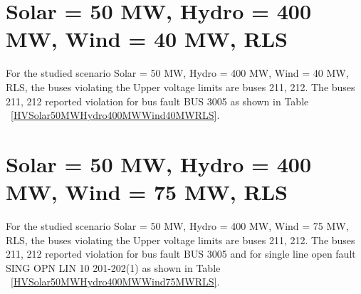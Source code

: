 \documentclass[10pt]{report}
\begin{document}
\section{Solar = 50 MW, Hydro = 400 MW, Wind = 40 MW, RLS}
For the studied scenario Solar = 50 MW, Hydro = 400 MW, Wind = 40 MW, RLS, the buses violating the Upper voltage limits are buses 211, 212.
The buses 211, 212 reported violation for bus fault BUS 3005 as shown in Table ~\ref{HVSolar50MWHydro400MWWind40MWRLS}.
\begin{table}[H]
\caption{Contingencies reporting bus voltages greater than emergency voltage of 1.1 PU for scenario Solar = 50 MW, Hydro = 400 MW, Wind = 40 MW, RLS}
\label{HVSolar50MWHydro400MWWind40MWRLS}
\centering
{}
\end{table}


\section{Solar = 50 MW, Hydro = 400 MW, Wind = 75 MW, RLS}
For the studied scenario Solar = 50 MW, Hydro = 400 MW, Wind = 75 MW, RLS, the buses violating the Upper voltage limits are buses 211, 212.
The buses 211, 212 reported violation for bus fault BUS 3005 and for single line open fault SING OPN LIN   10 201-202(1) as shown in Table ~\ref{HVSolar50MWHydro400MWWind75MWRLS}.
\begin{table}[H]
\caption{Contingencies reporting bus voltages greater than emergency voltage of 1.1 PU for scenario Solar = 50 MW, Hydro = 400 MW, Wind = 75 MW, RLS}
\label{HVSolar50MWHydro400MWWind75MWRLS}
\centering
{}
\end{table}
\end{document}
